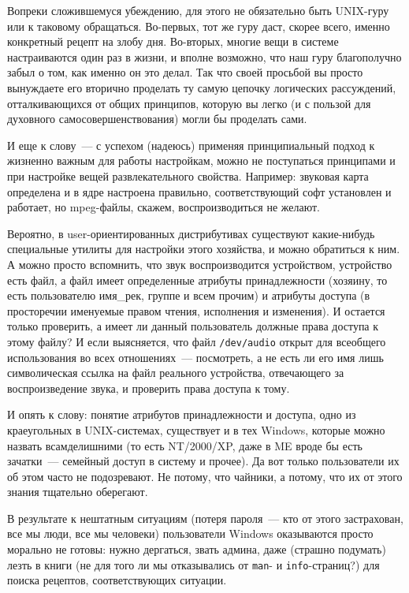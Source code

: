 Вопреки сложившемуся убеждению, для этого не обязательно быть UNIX-гуру или к таковому обращаться. Во-первых, тот же гуру даст, скорее всего, именно конкретный рецепт на злобу дня. Во-вторых, многие вещи в системе настраиваются один раз в жизни, и вполне возможно, что наш гуру благополучно забыл о том, как именно он это делал. Так что своей просьбой вы просто вынуждаете его вторично проделать ту самую цепочку логических рассуждений, отталкивающихся от общих принципов, которую вы легко (и с пользой для духовного самосовершенствования) могли бы проделать сами.

И еще к слову~--- с успехом (надеюсь) применяя принципиальный подход к жизненно важным для работы настройкам, можно не поступаться принципами и при настройке вещей развлекательного свойства. Например: звуковая карта определена и в ядре настроена правильно, соответствующий софт установлен и работает, но mpeg-файлы, скажем, воспроизводиться не желают.

Вероятно, в user-ориентированных дистрибутивах существуют какие-нибудь специальные утилиты для настройки этого хозяйства, и можно обратиться к ним. А можно просто вспомнить, что звук воспроизводится устройством, устройство есть файл, а файл имеет определенные атрибуты принадлежности (хозяину, то есть пользователю имя\_рек, группе и всем прочим) и атрибуты доступа (в просторечии именуемые правом чтения, исполнения и изменения). И остается только проверить, а имеет ли данный пользователь должные права доступа к этому файлу? И если выясняется, что файл 
\texttt{/dev/audio}
 открыт для всеобщего использования во всех отношениях~--- посмотреть, а не есть ли его имя лишь символическая ссылка на файл реального устройства, отвечающего за воспроизведение звука, и проверить права доступа к тому.

И опять к слову: понятие атрибутов принадлежности и доступа, одно из краеугольных в UNIX-системах, существует и в тех Windows, которые можно назвать всамделишними (то есть NT/2000/XP, даже в ME вроде бы есть зачатки~--- семейный доступ в систему и прочее). Да вот только пользователи их об этом часто не подозревают. Не потому, что чайники, а потому, что их от этого знания тщательно оберегают.

В результате к нештатным ситуациям (потеря пароля~--- кто от этого застрахован, все мы люди, все мы человеки) пользователи Windows оказываются просто морально не готовы: нужно дергаться, звать админа, даже (страшно подумать) лезть в книги (не для того ли мы отказывались от \texttt{man}- и \texttt{info}-страниц?) для поиска рецептов, соответствующих ситуации.

